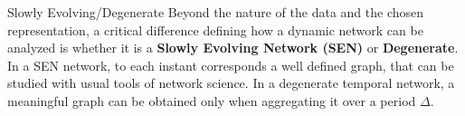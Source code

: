 \documentclass[a4paper,11pt]{book}
\begin{document}




\begin{textbox}{Slowly Evolving/Degenerate}
Beyond the nature of the data and the chosen representation, a critical difference defining how a dynamic network can be analyzed is whether it is a \textbf{Slowly Evolving Network (SEN)} or \textbf{Degenerate}. In a SEN network, to each instant corresponds a well defined graph, that can be studied with usual tools of network science. In a degenerate temporal network, a meaningful graph can be obtained only when aggregating it over a period $\Delta$.
\end{textbox}
\end{document}
